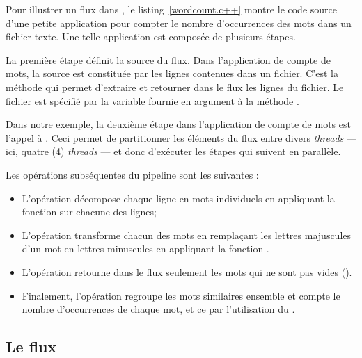 Pour illustrer un flux dans \PpFf, le listing~\ref{wordcount.c++} montre le code source d'une petite application pour compter le nombre d'occurrences des mots dans un fichier texte. Une telle application est compos\'ee de plusieurs \'etapes. 

La premi\`ere \'etape d\'efinit la source du flux. Dans l'application de compte de mots, la source est constitu\'ee par les lignes contenues dans un fichier. C'est la m\'ethode  qui permet d'extraire et retourner dans le flux les lignes du fichier. Le fichier est sp\'ecifi\'e par la variable  fournie en argument \`a la m\'ethode . 

Dans notre exemple, la deuxi\`eme \'etape dans l'application de compte de mots est l'appel \`a . Ceci permet de partitionner les \'el\'ements du flux entre divers \emph{threads} --- ici, quatre (4) \emph{threads} --- et donc d'ex\'ecuter les \'etapes qui suivent en parall\`ele. 

Les op\'erations subs\'equentes du pipeline sont les suivantes :
\begin{itemize}

\item L'op\'eration  d\'ecompose chaque ligne en mots individuels en appliquant la fonction  sur chacune des lignes;

\item L'op\'eration  transforme chacun des mots en rempla\c{c}ant les lettres majuscules d'un mot en lettres minuscules en appliquant la fonction .

\item L'op\'eration  retourne dans le flux seulement les mots qui ne sont pas vides ().



\item Finalement, l'op\'eration   regroupe les mots similaires ensemble et compte le nombre d'occurrences de chaque mot, et ce par l'utilisation du  . 
\end{itemize}





\subsection{Le flux}


